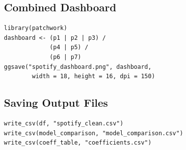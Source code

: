 \documentclass[12pt,a4paper]{article}
\begin{document}
\subsection{Combined Dashboard}

\begin{lstlisting}
library(patchwork)
dashboard <- (p1 | p2 | p3) /
             (p4 | p5) /
             (p6 | p7)
ggsave("spotify_dashboard.png", dashboard,
        width = 18, height = 16, dpi = 150)
\end{lstlisting}


\subsection{Saving Output Files}

\begin{lstlisting}
write_csv(df, "spotify_clean.csv")
write_csv(model_comparison, "model_comparison.csv")
write_csv(coeff_table, "coefficients.csv")
\end{lstlisting}





\end{document}

